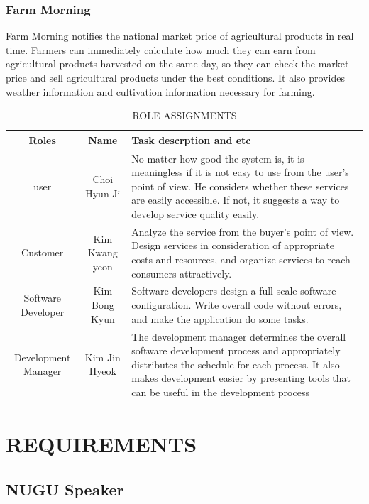 \documentclass[conference]{IEEEtran}
\begin{document}
\subsubsection{Farm Morning}
Farm Morning notifies the national market price of agricultural products in real time. Farmers can immediately calculate how much they can earn from agricultural products harvested on the same day, so they can check the market price and sell agricultural products under the best conditions. It also provides weather information and cultivation information necessary for farming.\\

\begin{table}[!htbp]
\caption{ROLE ASSIGNMENTS}
\begin{tabular}{|c|c|p{2.5cm}|}
\hline
Roles& Name & Task descrption and etc\\
\hline 
user&Choi Hyun Ji & No matter how good the system is, it is meaningless if it is not easy to use from the user's point of view. He considers whether these services are easily accessible. If not, it suggests a way to develop service quality easily.\\
\hline
Customer& Kim Kwang yeon &Analyze the service from the buyer's point of view. Design services in consideration of appropriate costs and resources, and organize services to reach consumers attractively. \\
\hline
Software Developer & Kim Bong Kyun & Software developers design a full-scale software configuration. Write overall code without errors, and make the application do some tasks.\\
\hline
Development Manager& Kim Jin Hyeok & The development manager determines the overall software development process and appropriately distributes the schedule for each process. It also makes development easier by presenting tools that can be useful in the development process\\
\hline
\end{tabular}
\end{table}

\section{REQUIREMENTS}
\subsection{NUGU Speaker }\label{AA}
\end{document}
